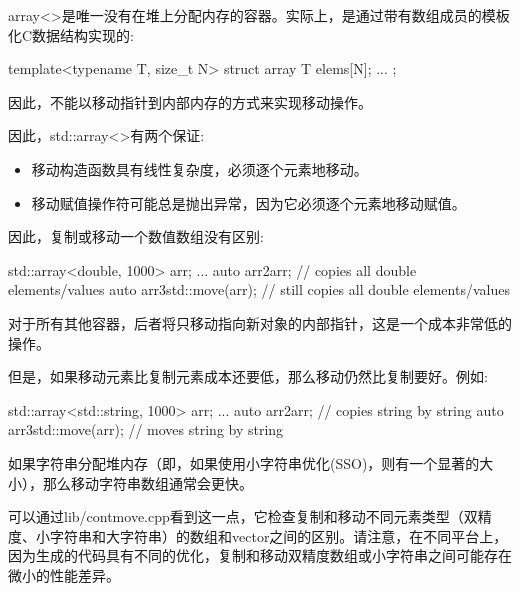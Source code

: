 array<>是唯一没有在堆上分配内存的容器。实际上，是通过带有数组成员的模板化C数据结构实现的:

\begin{cppcode}
template<typename T, size_t N>
struct array {
	T elems[N];
	...
};
\end{cppcode}

因此，不能以移动指针到内部内存的方式来实现移动操作。

因此，std::array<>有两个保证:

\begin{itemize}
	\item 移动构造函数具有线性复杂度，必须逐个元素地移动。
	\item 移动赋值操作符可能总是抛出异常，因为它必须逐个元素地移动赋值。
\end{itemize}

因此，复制或移动一个数值数组没有区别:

\begin{cppcode}
std::array<double, 1000> arr;
...
auto arr2{arr}; // copies all double elements/values
auto arr3{std::move(arr)}; // still copies all double elements/values
\end{cppcode}

对于所有其他容器，后者将只移动指向新对象的内部指针，这是一个成本非常低的操作。

但是，如果移动元素比复制元素成本还要低，那么移动仍然比复制要好。例如:

\begin{cppcode}
std::array<std::string, 1000> arr;
...
auto arr2{arr}; // copies string by string
auto arr3{std::move(arr)}; // moves string by string
\end{cppcode}

如果字符串分配堆内存（即，如果使用小字符串优化(SSO)，则有一个显著的大小），那么移动字符串数组通常会更快。

可以通过lib/contmove.cpp看到这一点，它检查复制和移动不同元素类型（双精度、小字符串和大字符串）的数组和vector之间的区别。请注意，在不同平台上，因为生成的代码具有不同的优化，复制和移动双精度数组或小字符串之间可能存在微小的性能差异。






















